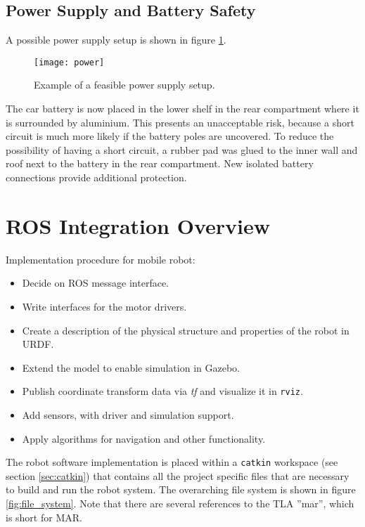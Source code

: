 \subsection{Power Supply and Battery Safety}

A possible power supply setup is shown in figure \ref{fig:power}.

\begin{figure}[h]
	\centering
	\texttt{[image: power]}
	\caption{Example of a feasible power supply setup.}
	\label{fig:power}
\end{figure}

The car battery is now placed in the lower shelf in the rear compartment where it is surrounded by aluminium. This presents an unacceptable risk, because a short circuit is much more likely if the battery poles are uncovered. To reduce the possibility of having a short circuit, a rubber pad was glued to the inner wall and roof next to the battery in the rear compartment. New isolated battery connections provide additional protection. 

\section{ROS Integration Overview}
\label{sec:integration}
Implementation procedure for mobile robot:

\begin{itemize}

	\item Decide on ROS message interface.
	\item Write interfaces for the motor drivers.
	\item Create a description of the physical structure and properties of the robot in \ac{URDF}. 
	\item Extend the model to enable simulation in Gazebo.
	\item Publish coordinate transform data via \textit{tf} and visualize it in \texttt{rviz}.
	\item Add sensors, with driver and simulation support.
	\item Apply algorithms for navigation and other functionality. 

\end{itemize}

The robot software implementation is placed within a \texttt{catkin} workspace (see section \ref{sec:catkin}) that contains all the project specific files that are necessary to build and run the robot system. The overarching file system is shown in figure \ref{fig:file_system}. Note that there are several references to the \ac{TLA} ''mar'', which is short for \ac{MAR}.

